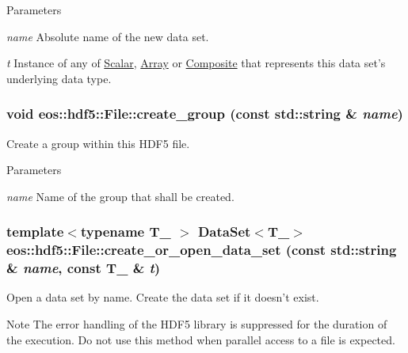 \begin{DoxyParams}{Parameters}
\item[{\em name}]Absolute name of the new data set. \item[{\em t}]Instance of any of \hyperlink{classeos_1_1hdf5_1_1Scalar}{Scalar}, \hyperlink{classeos_1_1hdf5_1_1Array}{Array} or \hyperlink{classeos_1_1hdf5_1_1Composite}{Composite} that represents this data set's underlying data type. \end{DoxyParams}
\hypertarget{classeos_1_1hdf5_1_1File_a56decaf8e9350e212044f8d1b5486699}{
\subsubsection[{create\_\-group}]{\setlength{\rightskip}{0pt plus 5cm}void eos::hdf5::File::create\_\-group (const std::string \& {\em name})}}
\label{classeos_1_1hdf5_1_1File_a56decaf8e9350e212044f8d1b5486699}
Create a group within this HDF5 file.


\begin{DoxyParams}{Parameters}
\item[{\em name}]Name of the group that shall be created. \end{DoxyParams}
\hypertarget{classeos_1_1hdf5_1_1File_a01aeea71760b5ca862900658602b71bd}{
\subsubsection[{create\_\-or\_\-open\_\-data\_\-set}]{\setlength{\rightskip}{0pt plus 5cm}template$<$typename T\_\- $>$ {\bf DataSet}$<$T\_\-$>$ eos::hdf5::File::create\_\-or\_\-open\_\-data\_\-set (const std::string \& {\em name}, \/  const T\_\- \& {\em t})}}
\label{classeos_1_1hdf5_1_1File_a01aeea71760b5ca862900658602b71bd}
Open a data set by name. Create the data set if it doesn't exist.

\begin{DoxyNote}{Note}
The error handling of the HDF5 library is suppressed for the duration of the execution. Do not use this method when parallel access to a file is expected.
\end{DoxyNote}

